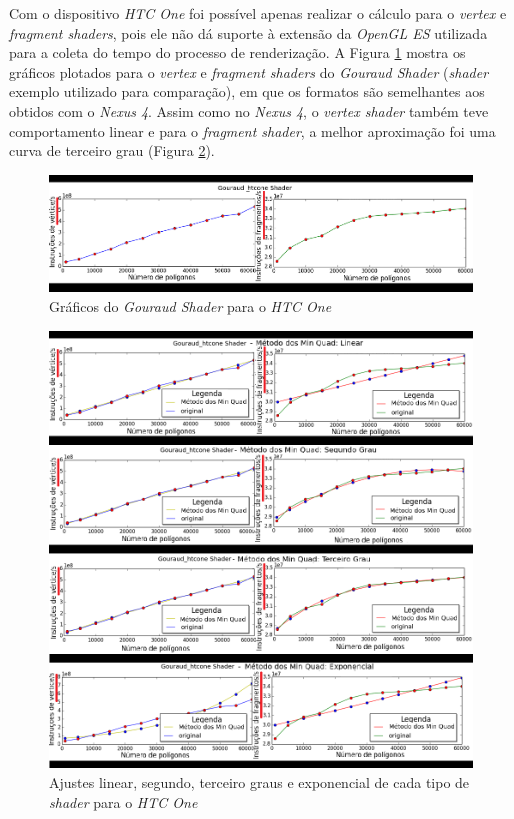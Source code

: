 	Com o dispositivo \textit{HTC One} foi possível apenas realizar o cálculo para o \textit{vertex} e \textit{fragment shaders}, pois ele não dá suporte à extensão da \textit{OpenGL ES} utilizada para a coleta do tempo do processo de renderização. A Figura \ref{htc1} mostra os gráficos plotados para o \textit{vertex} e \textit{fragment shaders} do \textit{Gouraud Shader} (\textit{shader} exemplo utilizado para comparação), em que os formatos são semelhantes aos obtidos com o \textit{Nexus 4}. Assim como no \textit{Nexus 4}, o \textit{vertex shader} também teve comportamento linear e para o \textit{fragment shader}, a melhor aproximação foi uma curva de terceiro grau (Figura \ref{htc1_ajuste}). 

	\begin{figure}[ht]
	\centering
		\includegraphics[keepaspectratio=true,scale=0.55]{figuras/htc_render_pt.png}
	\caption{Gráficos do \textit{Gouraud Shader} para o \textit{HTC One}}
	\label{htc1}
	\end{figure}

	\begin{figure}[ht]
	\centering
		\includegraphics[keepaspectratio=true,scale=0.6]{figuras/htc_minquad_render_pt.png}
	\caption{Ajustes linear, segundo, terceiro graus e exponencial de cada tipo de \textit{shader} para o \textit{HTC One}}
	\label{htc1_ajuste}
	\end{figure}	
	

